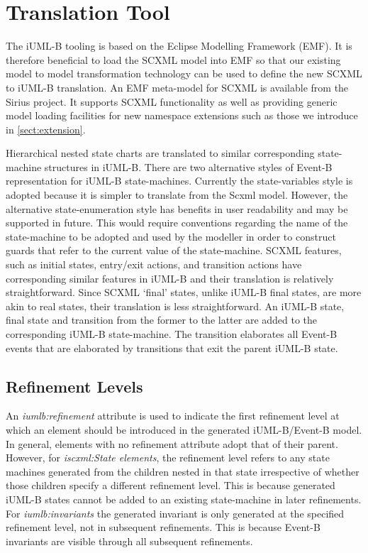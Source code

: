 
\section{Translation Tool}

The iUML-B tooling is based on the Eclipse Modelling Framework (EMF). It is therefore beneficial to load the SCXML model into EMF so that our existing model to model 
transformation technology can be used to define the new SCXML to iUML-B translation. An EMF meta-model for SCXML is available from the Sirius \cite{??}
project. It supports SCXML functionality as well as providing generic model loading facilities for new namespace extensions such as those we introduce in \ref{sect:extension}.

Hierarchical nested state charts are translated to similar  corresponding state-machine structures in iUML-B. 
There are two alternative styles of Event-B representation for iUML-B state-machines.  
Currently the state-variables style is adopted because it is simpler to translate from the Scxml model. 
However, the alternative state-enumeration style has benefits in user readability and may be supported in future.
This would  require conventions regarding the name of the state-machine  to be adopted and used by the modeller in order to construct guards that refer to the current value of the state-machine.
SCXML features, such as initial states, entry/exit actions, and transition actions have corresponding similar features in iUML-B and their translation is relatively straightforward. Since SCXML `final' states, unlike iUML-B final states, are more akin to real states, their translation is less straightforward. An iUML-B state, final state and transition from the former to the latter are added to the corresponding iUML-B state-machine. The transition elaborates all Event-B events that are elaborated by transitions that exit the parent iUML-B state. 

\subsection{Refinement Levels}
An \emph{iumlb:refinement} attribute is used to indicate the first refinement level at which an element should be introduced in the generated iUML-B/Event-B model. In general, elements with no refinement attribute adopt that of their parent.  However, for \emph{iscxml:State elements}, the refinement level refers to any state 
machines generated from the children nested in that state irrespective of whether those children specify a different refinement level. This is because generated iUML-B states cannot be added to an existing state-machine in later refinements.
For \emph{iumlb:invariants} the generated invariant is only  generated at the specified refinement level, not in  subsequent refinements. This is because Event-B invariants are visible through all subsequent refinements.

